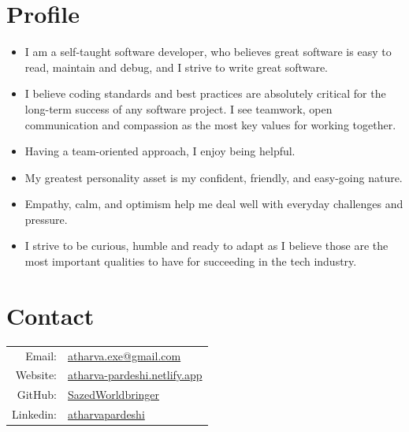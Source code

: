 \documentclass[11pt, oneside, a4paper, titlepage]{article}
\begin{document}
\begin{tcolorbox}
  \begin{minipage}[t]{8cm}
    \vspace*{-0.5cm}
    \begin{tcolorbox}[grow to left by=0.6cm,colback=gray!25,colframe=white]

      \section*{Profile}
      \begin{itemize}
        \item{
      I am a self-taught software developer,
      who believes great software is easy to read,
      maintain and debug, and I strive to write great software.
          }
        \item{
      I believe coding standards and best practices are absolutely critical
      for the long-term success of any software project.
      I see teamwork, open communication and compassion
      as the most key values for working together.
          }
        \item{
      Having a team-oriented approach, I enjoy being helpful.
          }
        \item{
      My greatest personality asset is my confident,
      friendly, and easy-going nature.
          }
        \item{
      Empathy, calm, and optimism
      help me deal well with everyday challenges and pressure.
        }
      \item{
      I strive to be curious, humble and ready to adapt
      as I believe those are the most important qualities to have
      for succeeding in the tech industry.
        }
      \end{itemize}

      \section*{Contact}
      \begin{tabular}{r l}
        Email: & \href{mailto:atharva.exe@gmail.com}{atharva.exe@gmail.com} \\
        Website: & \href{https://atharva-pardeshi.netlify.app}{atharva-pardeshi.netlify.app} \\
        GitHub: & \href{https://github.com/SazedWorldbringer}{SazedWorldbringer} \\
        Linkedin: & \href{https://linkedin.com/in/atharvapardeshi}{atharvapardeshi} \\
      \end{tabular}


\end{tcolorbox}
\end{minipage}
\end{tcolorbox}
\end{document}
